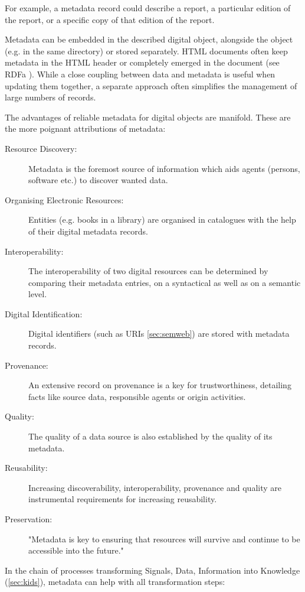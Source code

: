 \documentclass[a4paper,english,twoside,BCOR1.5cm,headsepline,DIV12,appendixprefix,final,12pt]{scrbook}
\begin{document}
For example, a metadata record could describe a report, a particular edition of the report, or a specific copy of that edition of the report. 

Metadata can be embedded in the described digital object, alongside the object (e.g. in the same directory) or stored separately. HTML documents often keep metadata in the HTML header or completely emerged in the document (see RDFa \cite{McCarronRDFaW3C2015}). While a close coupling between data and metadata is useful when updating them together, a separate approach often simplifies the management of large numbers of records.

The advantages of reliable metadata for digital objects are manifold. These are the more poignant attributions of metadata:

\begin{description}
\item [Resource Discovery:] Metadata is the foremost source of information which aids agents (persons, software etc.) to discover wanted data.
\item [Organising Electronic Resources:] Entities (e.g. books in a library) are organised in catalogues with the help of their digital metadata records.
\item [Interoperability:] The interoperability of two digital resources can be determined by comparing their metadata entries, on a syntactical as well as on a semantic level.
\item [Digital Identification:] Digital identifiers (such as URIs \cref{sec:semweb}) are stored with metadata records.
\item [Provenance:] An extensive record on provenance is a key for trustworthiness, detailing facts like source data, responsible agents or origin activities.
\item [Quality:] The quality of a data source is also established by the quality of its metadata.
\item [Reusability:] Increasing discoverability, interoperability, provenance and quality are instrumental requirements for increasing reusability. 
\item [Preservation:] "Metadata is key to ensuring that resources will survive and continue to be accessible into the future." \cite{NISO2004}
\end{description}

In the chain of processes transforming Signals, Data, Information into Knowledge (\cref{sec:kids}), metadata can help with all transformation steps:
\end{document}
